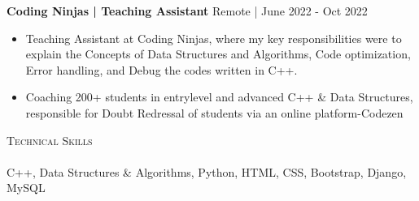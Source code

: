 \documentclass[a4paper]{article}
\newcommand{\lineunder} {
    \vspace*{-8pt} \\
    \hspace*{-18pt} \hrulefill \\
}
\newcommand{\header} [1] {
    {\hspace*{-18pt}\vspace*{6pt} \textsc{#1}}
    \vspace*{-6pt} \lineunder
}
\begin{document}
      \textbf{Coding Ninjas | Teaching Assistant} \hfill Remote | June 2022 - Oct 2022\\
          \vspace{-1mm}
\begin{itemize} \itemsep -2pt
  \item Teaching Assistant at Coding Ninjas, where my key responsibilities were to explain the Concepts of Data Structures and Algorithms, Code optimization, Error handling, and Debug the codes written in C++.
  \item Coaching 200+ students in entrylevel and advanced C++ \& Data Structures, responsible for Doubt Redressal of students via an online platform-Codezen
\end{itemize}

%
%
  \header{Technical Skills}
  \vspace{2mm}
  C++, Data Structures \& Algorithms, Python, HTML, CSS, Bootstrap, Django, MySQL
  \vspace{2mm}
\end{document}
